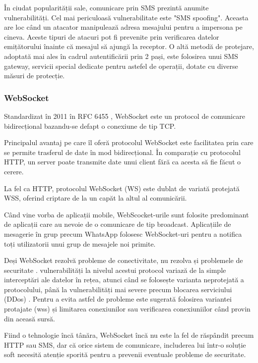 \documentclass[12pt]{article}
\begin{document}
În ciudat popularității sale, comunicare prin SMS prezintă
anumite vulnerabilități. Cel mai periculoasă vulnerabilitate 
este "SMS spoofing". Aceasta are loc când un atacator manipulează
adresa mesajului pentru a impersona pe cineva. Aceste tipuri de
atacuri pot fi prevenite prin verificarea datelor emițătorului 
înainte că mesajul să ajungă la receptor. O altă metodă de protejare,
adoptată mai ales în cadrul autentificării prin 2 pași, este folosirea unui
SMS gateway, servicii special dedicate pentru astefel de operații, dotate
cu diverse măsuri de protecție.

\subsubsection{WebSocket}

Standardizat în 2011 în RFC 6455 \cite{fette2011websocket}, WebSocket este
un protocol de comunicare bidirecțional bazandu-se defapt o conexiune de tip TCP.

Principalul avantaj pe care îl oferă protocolul WebSocket este facilitatea
prin care se permite trasferul de date în mod bidirecțional. În comparație cu protocolul HTTP,
un server poate transmite date unui client fără ca acesta să fie făcut o cerere.

La fel ca HTTP, protocolul WebSocket (WS) este dublat de variată protejată WSS, oferind
criptare de la un capăt la altul al comunicării.

Când vine vorba de aplicații mobile, WebScocket-urile sunt folosite
predominant de aplicații care au nevoie de o comunicare de tip broadcast. 
Aplicațiile de mesagerie în grup precum WhatsApp folosesc WebSocket-uri pentru
a notifica toți utilizatorii unui grup de mesajele noi primite.

Deși WebSocket rezolvă probleme de conectivitate, nu rezolva și problemele de 
securitate \cite{erkkila2012websocket}. vulnerabilități la nivelul acestui protocol
variază de la simple interceptări ale datelor în rețea, atunci când se folosește varianta
neprotejată a protocolului, până la vulnerabilități mai severe precum blocarea serviciului
(DDos) \cite{test-ws}. Pentru a evita astfel de probleme este sugerată folosirea variantei
protajate (wss) și limitarea conexiunilor sau verificarea conexiuniilor când provin din aceasă sursă.


Fiind o tehnologie încă tânăra, WebSocket încă nu este la fel de răspândit
precum HTTP sau SMS, dar că orice sistem de comunicare, includerea lui într-o
soluție soft necesită atenție sporită pentru a prevenii eventuale probleme de securitate.
\end{document}
